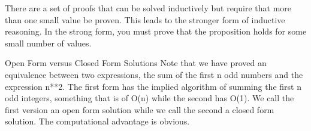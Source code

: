 There are a set of proofs that can be solved inductively but require that more than one small value be proven. This leads to the stronger form of inductive reasoning. In the strong form, you must prove that the proposition holds for some small number of values.

Open Form versus Closed Form Solutions
Note that we have proved an equivalence between two expressions, the sum of the first n odd numbers and the expression n**2. The first form has the implied algorithm of summing the first n odd integers, something that is of O(n) while the second has O(1). We call the first version an open form solution while we call the second a closed form solution. The computational advantage is obvious.

\newpage